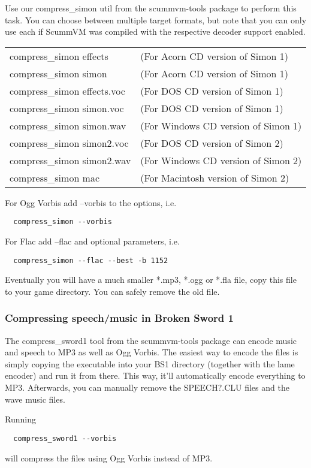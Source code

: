 Use our compress\_simon util from the scummvm-tools package to perform this task.
You can choose between multiple target formats, but note that you can only use
each if ScummVM was compiled with the respective decoder support enabled.

\begin{tabular}[h]{ll}
  compress\_simon effects    &(For Acorn CD version of Simon 1)\\
  compress\_simon simon      &(For Acorn CD version of Simon 1)\\
  compress\_simon effects.voc&(For DOS CD version of Simon 1)\\
  compress\_simon simon.voc  &(For DOS CD version of Simon 1)\\
  compress\_simon simon.wav  &(For Windows CD version of Simon 1)\\
  compress\_simon simon2.voc &(For DOS CD version of Simon 2)\\
  compress\_simon simon2.wav &(For Windows CD version of Simon 2)\\
  compress\_simon mac        &(For Macintosh version of Simon 2)\\
\end{tabular}

For Ogg Vorbis add --vorbis to the options, i.e.
\begin{verbatim}
  compress_simon --vorbis
\end{verbatim}
%
For Flac add --flac and optional parameters, i.e.
\begin{verbatim}
  compress_simon --flac --best -b 1152
\end{verbatim}
%
Eventually you will have a much smaller *.mp3, *.ogg or *.fla file, copy this
file to your game directory. You can safely remove the old file.


\subsubsection{Compressing speech/music in Broken Sword 1}

The compress\_sword1 tool from the scummvm-tools package can encode music and
speech to MP3 as well as Ogg Vorbis.
The easiest way to encode the files is simply copying the executable into your
BS1 directory (together with the lame encoder) and run it from there.
This way, it'll automatically encode everything to MP3.
Afterwards, you can manually remove the SPEECH?.CLU files and the wave music
files.

Running
\begin{verbatim}
  compress_sword1 --vorbis
\end{verbatim}
%
will compress the files using Ogg Vorbis instead of MP3.

